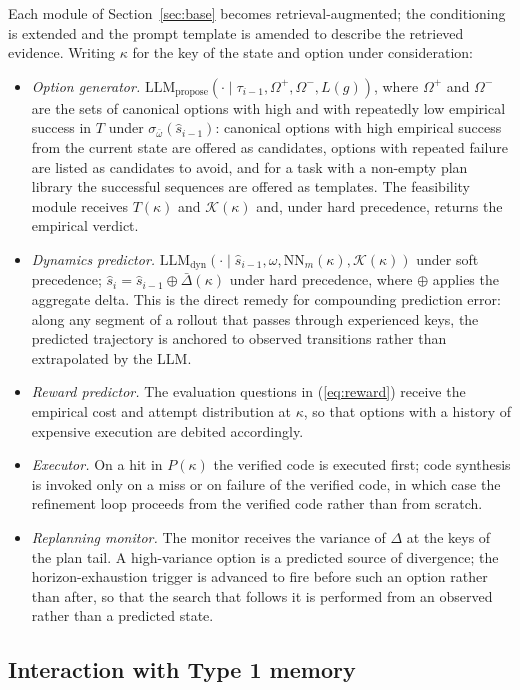 \documentclass[11pt]{article}
\newcommand{\llm}[1]{\mathrm{LLM}_{\mathrm{#1}}}
\newcommand{\shat}{\hat{s}}
\begin{document}
Each module of Section~\ref{sec:base} becomes retrieval-augmented; the conditioning is extended and the prompt template is amended to describe the retrieved evidence. Writing $\kappa$ for the key of the state and option under consideration:
\begin{itemize}[leftmargin=1.5em,itemsep=1pt]
\item \emph{Option generator.} $\llm{propose}(\cdot\mid\tau_{i-1},\Omega^{+},\Omega^{-},L(g))$, where $\Omega^{+}$ and $\Omega^{-}$ are the sets of canonical options with high and with repeatedly low empirical success in $T$ under $\sigma_{\bar\omega}(\shat_{i-1})$: canonical options with high empirical success from the current state are offered as candidates, options with repeated failure are listed as candidates to avoid, and for a task with a non-empty plan library the successful sequences are offered as templates. The feasibility module receives $T(\kappa)$ and $\mathcal{K}(\kappa)$ and, under hard precedence, returns the empirical verdict.
\item \emph{Dynamics predictor.} $\llm{dyn}(\cdot\mid\shat_{i-1},\omega,\mathrm{NN}_m(\kappa),\mathcal{K}(\kappa))$ under soft precedence; $\shat_i=\shat_{i-1}\oplus\bar\Delta(\kappa)$ under hard precedence, where $\oplus$ applies the aggregate delta. This is the direct remedy for compounding prediction error: along any segment of a rollout that passes through experienced keys, the predicted trajectory is anchored to observed transitions rather than extrapolated by the LLM.
\item \emph{Reward predictor.} The evaluation questions in (\ref{eq:reward}) receive the empirical cost and attempt distribution at $\kappa$, so that options with a history of expensive execution are debited accordingly.
\item \emph{Executor.} On a hit in $P(\kappa)$ the verified code is executed first; code synthesis is invoked only on a miss or on failure of the verified code, in which case the refinement loop proceeds from the verified code rather than from scratch.
\item \emph{Replanning monitor.} The monitor receives the variance of $\Delta$ at the keys of the plan tail. A high-variance option is a predicted source of divergence; the horizon-exhaustion trigger is advanced to fire before such an option rather than after, so that the search that follows it is performed from an observed rather than a predicted state.
\end{itemize}

\subsection{Interaction with Type 1 memory}
\label{sec:type1-type2}
\end{document}
